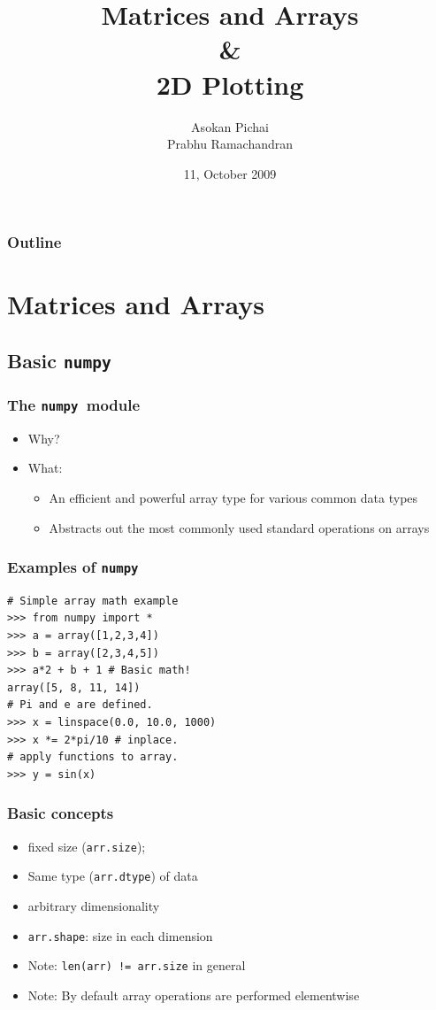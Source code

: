 \documentclass[14pt,compress]{beamer}
\title[]{Matrices and Arrays\\ \& \\2D Plotting}
\author[FOSSEE Team] {Asokan Pichai\\Prabhu Ramachandran}
\institute[FOSSEE] {FOSSEE Team}
\date[] {11, October 2009}
\newcounter{time}
\newcommand{\inctime}[1]{\addtocounter{time}{#1}{\tiny \thetime\ m}}
\newcommand{\typ}[1]{\lstinline{#1}}
\begin{document}
\begin{frame}
  \maketitle
\end{frame}

\begin{frame}
  \frametitle{Outline}
  \tableofcontents
\end{frame}

\section{Matrices and Arrays}

\subsection{Basic \typ{numpy} }

\newcommand{\num}{\texttt{numpy}}

\begin{frame}
  \frametitle{The \num\ module}
  \begin{itemize}
      \item Why?
  \item What:
    \begin{itemize}
    \item An efficient and powerful array type for various common data
      types
    \item Abstracts out the most commonly used standard operations on
      arrays
    \end{itemize}
  \end{itemize}
\end{frame}

\begin{frame}[fragile]
  \frametitle{Examples of \num}
\begin{lstlisting}
# Simple array math example
>>> from numpy import *
>>> a = array([1,2,3,4])
>>> b = array([2,3,4,5])
>>> a*2 + b + 1 # Basic math!
array([5, 8, 11, 14])
# Pi and e are defined.
>>> x = linspace(0.0, 10.0, 1000)
>>> x *= 2*pi/10 # inplace.
# apply functions to array.
>>> y = sin(x)
\end{lstlisting}
\inctime{5}
\end{frame}

\begin{frame}
  \frametitle{Basic concepts}
  \begin{itemize}
  \item fixed size (\typ{arr.size});
  \item Same type (\typ{arr.dtype}) of data
  \item arbitrary dimensionality
  \item \typ{arr.shape}: size in each dimension
  \item \alert{Note:} \typ{len(arr) != arr.size} in general
  \item \alert{Note:} By default array operations are performed
    \alert{elementwise}
  \end{itemize}
\end{frame}
\end{document}
